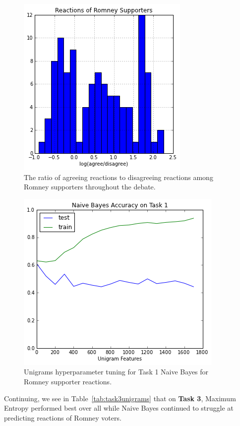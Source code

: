 \begin{figure}[]
	\centering
	\includegraphics[scale=0.60]{Figures/ngrams_balance_rom.png}
	\caption{The ratio of agreeing reactions to disagreeing reactions among Romney supporters throughout the debate.}
	\label{fig:ngramsbalancerom}
\end{figure}

\begin{figure}[]
	\centering
	\includegraphics[scale=0.60]{Figures/ngrams_hyperparam_task2_rom.png}
	\caption{Unigrams hyperparameter tuning for Task 1 Naive Bayes for Romney supporter reactions.}
	\label{fig:ngramstask2hyperparamrom}
\end{figure}

Continuing, we see in Table~\ref{tab:task3unigrams} that on \textbf{Task 3}, Maximum Entropy performed best over all while Naive Bayes continued to struggle at predicting reactions of Romney voters.

